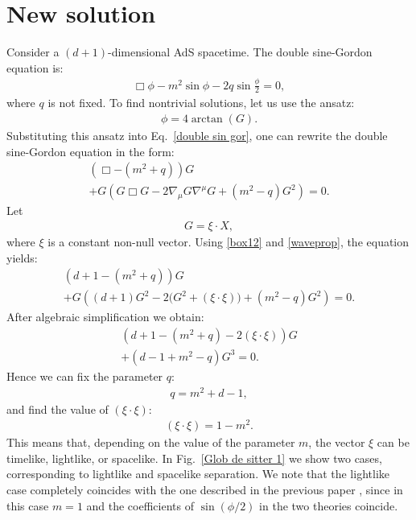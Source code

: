 \documentclass{article}
\begin{document}
\section{New solution}
Consider a $(d+1)$-dimensional AdS spacetime. The double sine-Gordon equation is:
\begin{align}
\label{double sin gor}
    \Box \phi - m^2 \sin \phi - 2 q \sin \frac{\phi}{2} = 0,
\end{align} 
where $q$ is not fixed.
To find nontrivial solutions, let us use the ansatz:
\begin{align}
    \phi = 4 \arctan(G).
\end{align}
Substituting this ansatz into Eq.~\eqref{double sin gor}, one can rewrite the double sine-Gordon equation in the form:
\begin{gather}
\label{two line}
   \left( \Box -  (m^2+q) \right) G \\
   + G \left( G \Box G - 2 \nabla_\mu G \nabla^\mu G + (m^2-q) G^2 \right) = 0. \nonumber
\end{gather}
Let
\begin{align}
    G = \xi \cdot X,
\end{align}
where $\xi$ is a constant non-null vector. Using \eqref{box12} and \eqref{waveprop}, the equation yields:
\begin{gather}
   \left( d+1 - (m^2+q) \right) G \\
   + G \left( (d+1) G^2 - 2 \bigl(G^2 + (\xi \cdot \xi)\bigr) + (m^2-q) G^2 \right) = 0. \nonumber
\end{gather}
After algebraic simplification we obtain:
\begin{gather}
   \left( d+1 - (m^2+q) -2 (\xi \cdot \xi)\right) G \\
   + \left( d-1  + m^2-q \right) G^3 = 0. \nonumber
\end{gather}
Hence we can fix the parameter $q$:
\begin{align}
    q=m^2+d-1,
\end{align}
and find the value of $(\xi \cdot\xi)$:
\begin{align}
    (\xi \cdot \xi) = 1 - m^2.
\end{align}
This means that, depending on the value of the parameter $m$, the vector $\xi$ can be timelike, lightlike, or spacelike. In Fig.~\ref{Glob de sitter 1} we show two cases, corresponding to lightlike and spacelike separation. We note that the lightlike case completely coincides with the one described in the previous paper \cite{Akhmedov:2026msi}, since in this case $m=1$ and the coefficients of $\sin(\phi/2)$ in the two theories coincide.
\end{document}

